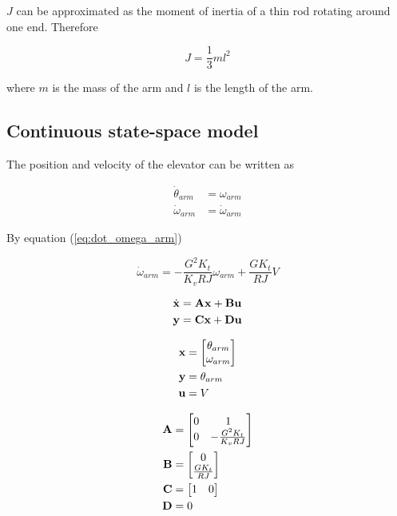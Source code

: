 $J$ can be approximated as the moment of inertia of a thin rod rotating around
one end. Therefore

\begin{equation}
  J = \frac{1}{3}ml^2
\end{equation}

where $m$ is the mass of the arm and $l$ is the length of the arm.

\subsection{Continuous state-space model}

The position and velocity of the elevator can be written as

\begin{align}
  \dot{\theta}_{arm} &= \omega_{arm} \label{eq:arm_cont_ss_pos} \\
  \dot{\omega}_{arm} &= \dot{\omega}_{arm} \label{eq:arm_cont_ss_vel}
\end{align}

By equation (\ref{eq:dot_omega_arm})

\begin{equation*}
  \dot{\omega}_{arm} = -\frac{G^2 K_t}{K_v RJ} \omega_{arm} + \frac{G K_t}{RJ} V
\end{equation*}

\begin{align*}
  \dot{\mathbf{x}} &= \mathbf{A} \mathbf{x} + \mathbf{B} \mathbf{u} \\
  \mathbf{y} &= \mathbf{C} \mathbf{x} + \mathbf{D} \mathbf{u}
\end{align*}

\begin{align*}
  \mathbf{x} &=
  \begin{bmatrix}
    \theta_{arm} \\
    \omega_{arm}
  \end{bmatrix} \\
  \mathbf{y} &= \theta_{arm} \\
  \mathbf{u} &= V
\end{align*}

\begin{align}
  \mathbf{A} &=
  \begin{bmatrix}
    0 & 1 \\
    0 & -\frac{G^2 K_t}{K_v RJ}
  \end{bmatrix} \\
  \mathbf{B} &=
  \begin{bmatrix}
    0 \\
    \frac{G K_t}{RJ}
  \end{bmatrix} \\
  \mathbf{C} &=
  \begin{bmatrix}
    1 & 0
  \end{bmatrix} \\
  \mathbf{D} &= 0
\end{align}

